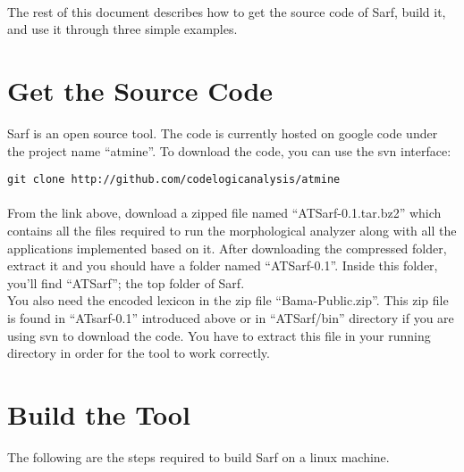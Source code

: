 \documentclass{article}
\begin{document}
\paragraph{}
The rest of this document describes how to get the source code of Sarf, build it, and use it through three simple examples.

\section{Get the Source Code}
\label{sec:sourcecode}

Sarf is an open source tool. The code is currently hosted on google code under the project name ``atmine''. To download the code, you can use the svn interface:\\

\begin{verbatim}
git clone http://github.com/codelogicanalysis/atmine 
\end{verbatim}


\paragraph{}
From the link above, download a zipped file named ``ATSarf-0.1.tar.bz2'' which contains all the files required to run the morphological analyzer along with all the applications implemented based on it. After downloading the compressed folder, extract it and you should have a folder named ``ATSarf-0.1''. Inside this folder, you'll find ``ATSarf''; the top folder of Sarf.\\
You also need the encoded lexicon in the zip file ``Bama-Public.zip''. This zip file is found in ``ATsarf-0.1'' introduced above or in ``ATSarf/bin'' directory if you are using svn to download the code. You have to extract this file in your running directory in order for the tool to work correctly.

\section{Build the Tool}
The following are the steps required to build Sarf on a linux machine.
\end{document}

